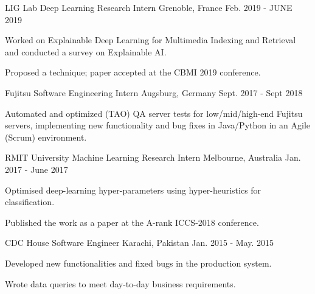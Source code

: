 \begin{cventries}
  \cventry
    {LIG Lab} %
    {Deep Learning Research Intern} %
    {Grenoble, France} %
    {Feb. 2019 - JUNE 2019} %
    {
      \begin{cvitems} %
        \item {Worked on Explainable Deep Learning for Multimedia Indexing and Retrieval and conducted a survey on Explainable AI.}
        \item {Proposed a technique; paper accepted at the CBMI 2019 conference.}
      \end{cvitems}
    }

  \cventry
    {Fujitsu} %
    {Software Engineering Intern} %
    {Augsburg, Germany} %
    {Sept. 2017 - Sept 2018} %
    {
      \begin{cvitems} %
        \item {Automated and optimized (TAO) QA server tests for low/mid/high-end Fujitsu servers, implementing new functionality and bug fixes in Java/Python in an Agile (Scrum) environment.}
      \end{cvitems}
    }

  \cventry
    {RMIT University} %
    {Machine Learning Research Intern} %
    {Melbourne, Australia} %
    {Jan. 2017 - June 2017} %
    {
      \begin{cvitems} %
        \item {Optimised deep-learning hyper-parameters using hyper-heuristics for classification.}
        \item {Published the work as a paper at the A-rank ICCS-2018 conference.}
      \end{cvitems}
    }

  \cventry
    {CDC House} %
    {Software Engineer} %
    {Karachi, Pakistan} %
    {Jan. 2015 - May. 2015} %
    {
      \begin{cvitems} %
        \item {Developed new functionalities and fixed bugs in the production system.}
        \item {Wrote data queries to meet day-to-day business requirements.}
      \end{cvitems}
    }


\end{cventries}
